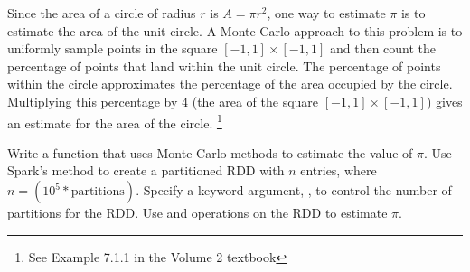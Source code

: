 \begin{problem}
Since the area of a circle of radius $r$ is $A=\pi r^2$, one way to estimate $\pi$ is to estimate the area of the unit circle. A Monte Carlo approach to this problem is to uniformly sample points in the square $[-1,1]\times [-1,1]$ and then count the percentage of points that land within the unit circle. The percentage of points within the circle approximates the percentage of the area occupied by the circle. Multiplying this percentage by 4 (the area of the square $[-1,1]\times [-1,1]$) gives an estimate for the area of the circle.
\footnote{See Example 7.1.1 in the Volume 2 textbook}

Write a function that uses Monte Carlo methods to estimate the value of $\pi$. 
Use Spark's  method to create a partitioned RDD with $n$ entries, where $n=(10^5*\text{partitions})$. Specify a keyword argument, , to control the number of partitions for the RDD. Use  and  operations on the RDD to estimate $\pi$. 
\label{prob:spark-monte-carlo-simulation}
\end{problem}




